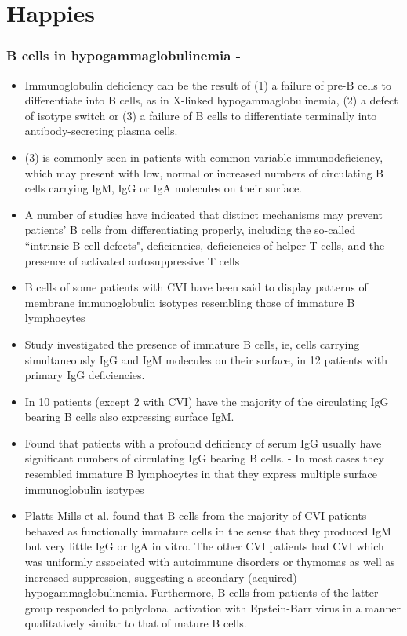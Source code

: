 \documentclass[12pt]{article}
\begin{document}
		
			
			\section{Happies}

	
	\subsubsection{B cells in hypogammaglobulinemia - \citeauthor{Fiorilli86} \citeyear{Fiorilli86}}
	
	
	
	\begin{itemize}
		\item Immunoglobulin deficiency can be the result of (1) a failure of pre-B cells to differentiate into B cells, as in X-linked hypogammaglobulinemia, (2) a defect of isotype switch or (3) a failure of B cells to differentiate terminally into antibody-secreting plasma cells.
		\item (3) is commonly seen in patients with common variable immunodeficiency, which may present with low, normal or increased numbers of circulating B cells carrying IgM, IgG or IgA molecules on their surface.
		\item A number of studies have indicated that distinct mechanisms may prevent patients' B cells from differentiating properly, including the so-called ``intrinsic B cell defects", deficiencies, deficiencies of helper T cells, and the presence of activated autosuppressive T cells
		\item B cells of some patients with CVI have been said to display patterns of membrane immunoglobulin isotypes resembling those of immature B lymphocytes
		\item Study investigated the presence of immature B cells, ie, cells carrying simultaneously IgG and IgM molecules on their surface, in 12 patients with primary IgG deficiencies. 
		\item In 10 patients (except 2 with CVI) have the majority of the circulating IgG bearing B cells also expressing surface IgM. 
		\item Found that patients with a profound deficiency of serum IgG usually have significant numbers of circulating IgG bearing B cells. - In most cases they resembled immature B lymphocytes in that they express multiple surface immunoglobulin isotypes
		\item Platts-Mills et al. found that B cells from the majority of CVI patients behaved as functionally immature cells in the sense that they produced IgM but very little IgG or IgA in vitro. The other CVI patients had CVI which was uniformly associated with autoimmune disorders or thymomas as well as increased suppression, suggesting a secondary (acquired) hypogammaglobulinemia. Furthermore, B cells from patients of the latter group responded to polyclonal activation with Epstein-Barr virus in a manner qualitatively similar to that of mature B cells. 
	\end{itemize}
	
\end{document}
